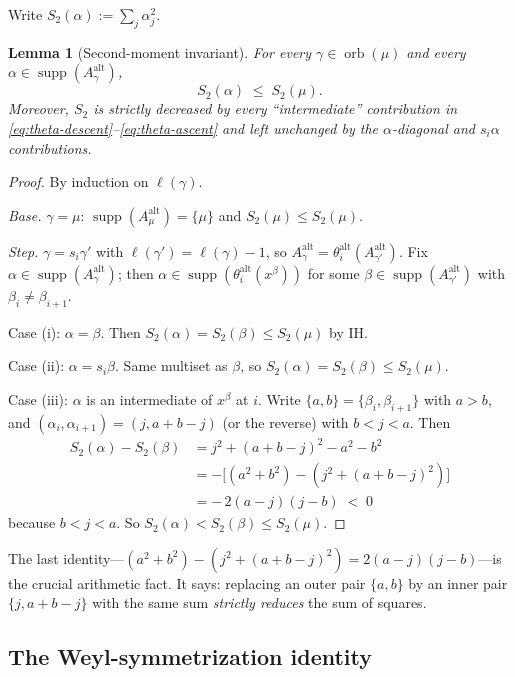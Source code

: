 \documentclass[11pt]{article}
\newtheorem{lemma}[theorem]{Lemma}
\theoremstyle{definition}
\theoremstyle{remark}
\newcommand{\orb}{\operatorname{orb}}
\newcommand{\supp}{\operatorname{supp}}
\newcommand{\Aalt}{A^{\mathrm{alt}}}
\newcommand{\thetaalt}{\theta^{\mathrm{alt}}}
\begin{document}
Write $S_2(\alpha) := \sum_j \alpha_j^2$.

\begin{lemma}[Second-moment invariant]\label{lem:secondmoment}
For every $\gamma \in \orb(\mu)$ and every $\alpha \in \supp(\Aalt_\gamma)$,
\[
  S_2(\alpha) \;\le\; S_2(\mu).
\]
Moreover, $S_2$ is strictly decreased by every ``intermediate'' contribution
in \eqref{eq:theta-descent}--\eqref{eq:theta-ascent} and left unchanged by the
$\alpha$-diagonal and $s_i\alpha$ contributions.
\end{lemma}

\begin{proof}
By induction on $\ell(\gamma)$.

\emph{Base.} $\gamma = \mu$: $\supp(\Aalt_\mu) = \{\mu\}$ and $S_2(\mu) \le S_2(\mu)$. \checkmark

\emph{Step.} $\gamma = s_i \gamma'$ with $\ell(\gamma') = \ell(\gamma)-1$, so
$\Aalt_\gamma = \thetaalt_i(\Aalt_{\gamma'})$. Fix $\alpha \in \supp(\Aalt_\gamma)$;
then $\alpha \in \supp(\thetaalt_i(x^\beta))$ for some $\beta \in \supp(\Aalt_{\gamma'})$
with $\beta_i \ne \beta_{i+1}$.

Case (i): $\alpha = \beta$. Then $S_2(\alpha) = S_2(\beta) \le S_2(\mu)$ by IH.

Case (ii): $\alpha = s_i\beta$. Same multiset as $\beta$, so
$S_2(\alpha) = S_2(\beta) \le S_2(\mu)$.

Case (iii): $\alpha$ is an intermediate of $x^\beta$ at $i$. Write
$\{a,b\} = \{\beta_i,\beta_{i+1}\}$ with $a>b$, and $(\alpha_i,\alpha_{i+1}) = (j,a+b-j)$
(or the reverse) with $b<j<a$. Then
\begin{align*}
  S_2(\alpha) - S_2(\beta)
  &= j^2 + (a+b-j)^2 - a^2 - b^2 \\
  &= -\bigl[(a^2+b^2) - (j^2 + (a+b-j)^2)\bigr] \\
  &= -\,2(a-j)(j-b) \;<\; 0
\end{align*}
because $b < j < a$. So $S_2(\alpha) < S_2(\beta) \le S_2(\mu)$.
\qedhere
\end{proof}

The last identity---$(a^2+b^2) - (j^2 + (a+b-j)^2) = 2(a-j)(j-b)$---is the
crucial arithmetic fact. It says: replacing an outer pair $\{a,b\}$ by an
inner pair $\{j, a+b-j\}$ with the same sum \emph{strictly reduces} the sum
of squares.

\subsection{The Weyl-symmetrization identity}
\end{document}

